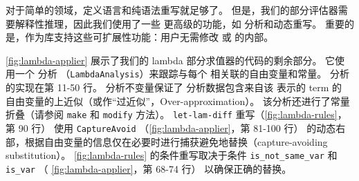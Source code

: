 对于简单的领域，定义语言和纯语法重写就足够了。
但是，我们的部分评估器需要解释性推理，因此我们使用了一些 \egg 更高级的功能，如 \eclass 分析和动态重写。
重要的是，\egg 作为库支持这些可扩展性功能：用户无需修改 \egraph 或 \egg 的内部。



\autoref{fig:lambda-applier} 展示了我们的 lambda 部分求值器的代码的剩余部分。
它使用一个 \eclass 分析 （\texttt{LambdaAnalysis}）来跟踪与每个 \eclass 相关联的自由变量和常量。
\eclass 分析的实现在第 11-50 行。
\eclass 分析不变量保证了
  分析数据包含来自该 \eclass 表示的 term 的
  自由变量的上近似（或作“过近似”，Over-approximation）。%
该分析还进行了常量折叠（请参阅 \texttt{make} 和 \texttt{modify} 方法）。
\texttt{let-lam-diff} 重写（\autoref{fig:lambda-rules}，第 90 行）
  使用 \texttt{CaptureAvoid} （\autoref{fig:lambda-applier}，第 81-100 行）
  的动态右部，根据自由变量的信息仅在必要时进行捕获避免地替换（capture-avoiding substitution）。
\autoref{fig:lambda-rules} 的条件重写取决于条件 \texttt{is\_not\_same\_var} 和 \texttt{is\_var} 
  （ \autoref{fig:lambda-applier}，第 68-74 行） 以确保正确的替换。


